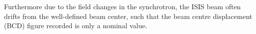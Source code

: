 \documentclass[a4paper,11pt]{article}
\begin{document}

 Furthermore due to the field changes in the synchrotron, the ISIS beam often drifts from the well-defined beam center, such that the beam centre displacement (BCD) figure recorded is only a nominal value. 
\end{document}
